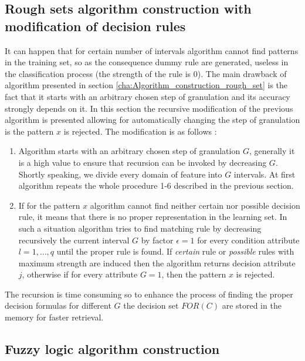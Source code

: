 \subsection{Rough sets algorithm construction with modification of decision rules}
\label{cha:Algorithm_construction_rough_set_modification}
It can happen that for certain number of intervals algorithm cannot find patterns in
the training set, so as the consequence dummy rule are generated, useless in the
classification process (the strength of the rule is 0). 
The main drawback of algorithm presented in section \ref{cha:Algorithm_construction_rough_set}
is the fact that it starts with an arbitrary chosen step of granulation and its accuracy strongly
depends on it. In this section the recursive modification of the previous algorithm is
presented allowing for automatically changing the step of granulation is
the pattern $x$ is rejected. The modification is as follows \cite{bib36}:
\begin{enumerate}
    \item Algorithm starts with an arbitrary chosen step of granulation $G$, 
        generally it is a high value to ensure that recursion can be invoked
        by decreasing $G$. Shortly speaking, we divide every domain of feature into $G$
        intervals. At first algorithm repeats the whole procedure 1-6 described
        in the previous section.
    \item If for the pattern $x$ algorithm cannot find neither certain nor possible
        decision rule, it means that there is no proper representation in the learning set. 
        In such a situation algorithm tries to find matching rule by decreasing recursively
        the current interval $G$ by factor $\epsilon=1$ for every condition attribute $l=1, \ldots, q$
        until the proper rule is found. If \textit{certain} rule or
        \textit{possible} rules with maximum strength are induced then the algorithm
        returns decision attribute $j$, otherwise if for every attribute $G=1$, then the pattern $x$ is rejected.
\end{enumerate}
The recursion is time consuming so to enhance the process of finding the proper
decision formulas for different $G$ the decision set $FOR(C)$ are stored in the memory
for faster retrieval.

\subsection{Fuzzy logic algorithm construction}
\label{cha:Algorithm_construction_fuzzy_logic}
